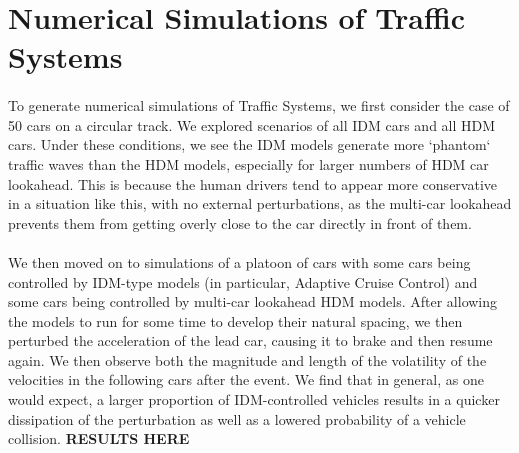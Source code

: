 \documentclass[11pt]{article}
\begin{document}
\section{Numerical Simulations of Traffic Systems}

\paragraph{}To generate numerical simulations of Traffic Systems, we first consider the case of 50 cars on a circular track. We explored scenarios of all IDM cars and all HDM cars. Under these conditions, we see the IDM models generate more `phantom` traffic waves than the HDM models, especially for larger numbers of HDM car lookahead. This is because the human drivers tend to appear more conservative in a situation like this, with no external perturbations, as the multi-car lookahead prevents them from getting overly close to the car directly in front of them.



\paragraph{}We then moved on to simulations of a platoon of cars with some cars being controlled by IDM-type models (in particular, Adaptive Cruise Control) and some cars being controlled by multi-car lookahead HDM models. After allowing the models to run for some time to develop their natural spacing, we then perturbed the acceleration of the lead car, causing it to brake and then resume again. We then observe both the magnitude and length of the volatility of the velocities in the following cars after the event. We find that in general, as one would expect, a larger proportion of IDM-controlled vehicles results in a quicker dissipation of the perturbation as well as a lowered probability of a vehicle collision.
\textbf{RESULTS HERE}
\end{document}

